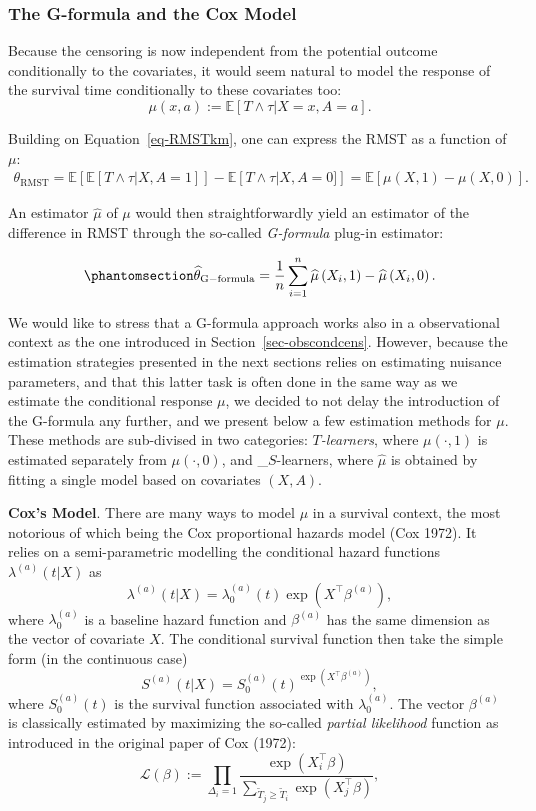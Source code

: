\documentclass[
  11pt,
  a4paper,
]{article}
\theoremstyle{plain}
\theoremstyle{plain}
\theoremstyle{plain}
\theoremstyle{definition}
\theoremstyle{remark}
\begin{document}
\subsubsection{The G-formula and the Cox Model}\label{sec-Gformula}

Because the censoring is now independent from the potential outcome
conditionally to the covariates, it would seem natural to model the
response of the survival time conditionally to these covariates too: \[
\mu(x,a) := \mathbb{E}[T \wedge \tau |X = x, A = a].
\]

Building on Equation~\ref{eq-RMSTkm}, one can express the RMST as a
function of \(\mu\): \begin{align*}
 \theta_{\mathrm{RMST}} = \mathbb{E}\left[\mathbb{E}[T \wedge \tau |X, A = 1]\right] - \mathbb{E}\left[ T \wedge \tau|X, A= 0]\right] = \mathbb{E}[\mu(X,1)-\mu(X,0)].
\end{align*}

An estimator \(\widehat\mu\) of \(\mu\) would then straightforwardly
yield an estimator of the difference in RMST through the so-called
\emph{G-formula} plug-in estimator:

\begin{equation}\phantomsection\label{eq-gformula}{ \widehat{\theta}_{\mathrm{G-formula}} = \frac{1}{n} \sum_{i=1}^n \widehat\mu\left(X_i, 1\right)-\widehat\mu\left(X_i, 0\right). }\end{equation}

We would like to stress that a G-formula approach works also in a
observational context as the one introduced in
Section~\ref{sec-obscondcens}. However, because the estimation
strategies presented in the next sections relies on estimating nuisance
parameters, and that this latter task is often done in the same way as
we estimate the conditional response \(\mu\), we decided to not delay
the introduction of the G-formula any further, and we present below a
few estimation methods for \(\mu\). These methods are sub-divised in two
categories: \emph{\(T\)-learners}, where \(\mu(\cdot,1)\) is estimated
separately from \(\mu(\cdot,0)\), and \_\(S\)-learners, where
\(\widehat\mu\) is obtained by fitting a single model based on
covariates \((X,A)\).

\textbf{Cox's Model}. There are many ways to model \(\mu\) in a survival
context, the most notorious of which being the Cox proportional hazards
model (Cox 1972). It relies on a semi-parametric modelling the
conditional hazard functions \(\lambda^{(a)}(t|X)\) as \[
\lambda^{(a)}(t|X) = \lambda_0^{(a)}(t) \exp(X^\top\beta^{(a)}),
\] where \(\lambda^{(a)}_0\) is a baseline hazard function and
\(\beta^{(a)}\) has the same dimension as the vector of covariate \(X\).
The conditional survival function then take the simple form (in the
continuous case) \[
S^{(a)}(t|X) = S^{(a)}_0(t)^{\exp(X^\top\beta^{(a)})},
\] where \(S^{(a)}_0(t)\) is the survival function associated with
\(\lambda_0^{(a)}\). The vector \(\beta^{(a)}\) is classically estimated
by maximizing the so-called \emph{partial likelihood} function as
introduced in the original paper of Cox (1972): \[
\mathcal{L}(\beta) := \prod_{\Delta_i = 1} \frac{\exp(X_i^\top \beta)}{\displaystyle\sum_{\widetilde T_j \geqslant\widetilde T_i} \exp(X_j^\top \beta)},
\]
\end{document}
